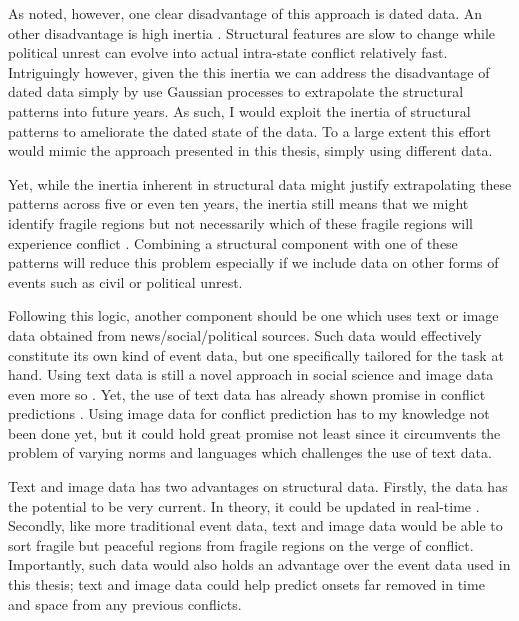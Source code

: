 \documentclass[a4paper]{article}
\begin{document}
As noted, however, one clear disadvantage of this approach is dated data. An other disadvantage is high inertia \citep[10]{chadefaux2017conflict}. Structural features are slow to change while political unrest can evolve into actual intra-state conflict relatively fast. Intriguingly however, given the this inertia we can address the disadvantage of dated data simply by use Gaussian processes to extrapolate the structural patterns into future years. As such, I would exploit the inertia of structural patterns to ameliorate the dated state of the data. To a large extent this effort would mimic the approach presented in this thesis, simply using different data.\par

Yet, while the inertia inherent in structural data might justify extrapolating these patterns across five or even ten years, the inertia still means that we might identify fragile regions but not necessarily which of these fragile regions will experience conflict \citep[10]{chadefaux2017conflict}. Combining a structural component with one of these patterns will reduce this problem especially if we include data on other forms of events such as civil or political unrest.\par 

Following this logic, another component should be one which uses text or image data obtained from news/social/political sources. Such data would effectively constitute its own kind of event data, but one specifically tailored for the task at hand. Using text data is still a novel approach in social science \citep{grimmer2013text} and image data even more so \citep{williams2019images}. Yet, the use of text data has already shown promise in conflict predictions \citep{chadefaux_2014, mueller_2016}. Using image data for conflict prediction has to my knowledge not been done yet, but it could hold great promise not least since it circumvents the problem of varying norms and languages which challenges the use of text data. \par

Text and image data has two advantages on structural data. Firstly, the data has the potential to be very current. In theory, it could be updated in real-time \citep[474]{cederman2017predicting}. Secondly, like more traditional event data, text and image data would be able to sort fragile but peaceful regions from fragile regions on the verge of conflict. Importantly, such data would also holds an advantage over the event data used in this thesis; text and image data could help predict onsets far removed in time and space from any previous conflicts.\par
\end{document}
